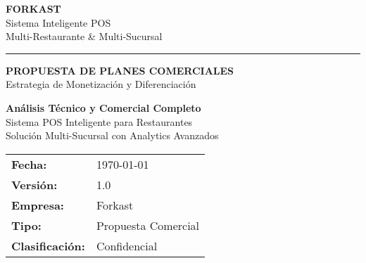 \documentclass[12pt,a4paper]{article}
\begin{document}
\begin{titlepage}
    \centering
    \vspace*{1cm}
    
    {\Huge\bfseries\color{primaryblue} FORKAST}\\[0.3cm]
    {\Large\color{secondarygreen} Sistema Inteligente POS}\\[0.2cm]
    {\large\color{accentpurple} Multi-Restaurante \& Multi-Sucursal}\\[1cm]
    
    \rule{\textwidth}{2pt}
    \vspace{0.5cm}
    
    {\Huge\bfseries\color{primaryblue} PROPUESTA DE PLANES COMERCIALES}\\[0.5cm]
    {\Large\color{secondarygreen} Estrategia de Monetización y Diferenciación}\\[1cm]
    
    \begin{tcolorbox}[colback=primaryblue!5, colframe=primaryblue, width=0.9\textwidth, center, boxrule=2pt]
        \centering
        {\Large\bfseries\color{primaryblue} Análisis Técnico y Comercial Completo}\\[0.5cm]
        {\large\color{secondarygreen} Sistema POS Inteligente para Restaurantes}\\[0.3cm]
        {\normalsize\color{accentpurple} Solución Multi-Sucursal con Analytics Avanzados}
    \end{tcolorbox}
    
    \vspace{2cm}
    
    \begin{tcolorbox}[colback=secondarygreen!5, colframe=secondarygreen, width=0.7\textwidth, center]
        \centering
        \begin{tabular}{ll}
            \textbf{Fecha:} & \today \\
            \textbf{Versión:} & 1.0 \\
            \textbf{Empresa:} & Forkast \\
            \textbf{Tipo:} & Propuesta Comercial \\
            \textbf{Clasificación:} & Confidencial \\
        \end{tabular}
    \end{tcolorbox}
    

\end{titlepage}
\end{document}
